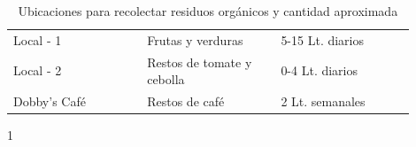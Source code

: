 \begin{table}[H]

\caption{Ubicaciones para recolectar residuos orgánicos y cantidad aproximada}
\label{tab:ubicaciones_para_contenedores}

\begin{threeparttable}

{\small{}

\begin{tabular}{M{0.3\linewidth}M{0.3\linewidth}M{0.3\linewidth}}\hline
    
     &  &  \\ \hline

    Local - 1  & Frutas y verduras & 5-15 Lt. diarios \\
    Local - 2 & Restos de tomate y cebolla & 0-4 Lt. diarios \\
    Dobby’s Café & Restos de café  & 2 Lt. semanales \\

    \hline
\end{tabular}

}

\begin{tablenotes}\tiny %
    \item[1] 
\end{tablenotes}

\end{threeparttable}
\end{table}